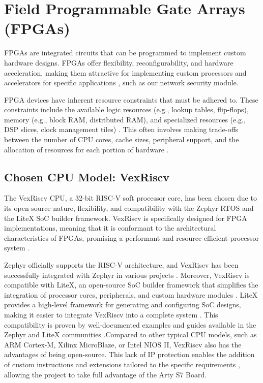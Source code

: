 \section{Field Programmable Gate Arrays (FPGAs)}
FPGAs are integrated circuits that can be programmed to implement custom hardware designs. FPGAs offer flexibility, reconfigurability, and hardware acceleration, making them attractive for implementing custom processors and accelerators for specific applications \cite{Trimberger2018}, such as our network security module.

FPGA devices have inherent resource constraints that must be adhered to. These constraints include the available logic resources (e.g., lookup tables, flip-flops), memory (e.g., block RAM, distributed RAM), and specialized resources (e.g., DSP slices, clock management tiles) \cite{Kuon2008}. This often involves making trade-offs between the number of CPU cores, cache sizes, peripheral support, and the allocation of resources for each portion of hardware \cite{Kuon2008}\cite{Koch2016}.

\subsection{Chosen CPU Model: VexRiscv}
\label{subsection:VexRiscv}
The VexRiscv CPU, a 32-bit RISC-V soft processor core, has been chosen due to its open-source nature, flexibility, and compatibility with the Zephyr RTOS and the LiteX SoC builder framework. VexRiscv is specifically designed for FPGA implementations, meaning that it is conformant to the architectural characteristics of FPGAs, promising a performant and resource-efficient processor system \cite{VexRiscvGitHub}.

Zephyr officially supports the RISC-V architecture, and VexRiscv has been successfully integrated with Zephyr in various projects \cite{ZephyrProject}. Moreover, VexRiscv is compatible with LiteX, an open-source SoC builder framework that simplifies the integration of processor cores, peripherals, and custom hardware modules \cite{LiteXProject}. LiteX provides a high-level framework for generating and configuring SoC designs, making it easier to integrate VexRiscv into a complete system \cite{LiteXProject}. This compatibility is proven by well-documented examples and guides available in the Zephyr and LiteX communities \cite{ZephyrProject}\cite{LiteXProject}.Compared to other typical CPU models, such as ARM Cortex-M, Xilinx MicroBlaze, or Intel NIOS II, VexRiscv also has the advantages of being open-source. This lack of IP protection enables the addition of custom instructions and extensions tailored to the specific requirements \cite{VexRiscvGitHub}, allowing the project to take full advantage of the Arty S7 Board.

